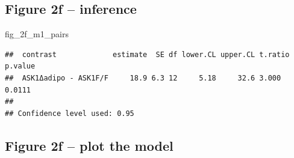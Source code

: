 \documentclass[]{book}
\newenvironment{Shaded}{\begin{snugshade}}{\end{snugshade}}
\newcommand{\DataTypeTok}[1]{\textcolor[rgb]{0.13,0.29,0.53}{#1}}
\newcommand{\KeywordTok}[1]{\textcolor[rgb]{0.13,0.29,0.53}{\textbf{#1}}}
\newcommand{\NormalTok}[1]{#1}
\newcommand{\OperatorTok}[1]{\textcolor[rgb]{0.81,0.36,0.00}{\textbf{#1}}}
\newcommand{\OtherTok}[1]{\textcolor[rgb]{0.56,0.35,0.01}{#1}}
\newcommand{\StringTok}[1]{\textcolor[rgb]{0.31,0.60,0.02}{#1}}
\begin{document}
\hypertarget{figure-2f-inference}{%
\subsection{Figure 2f -- inference}\label{figure-2f-inference}}

\begin{Shaded}
\end{Shaded}

\begin{Shaded}
\begin{Highlighting}[]
\NormalTok{fig_2f_m1_pairs}
\end{Highlighting}
\end{Shaded}

\begin{verbatim}
##  contrast             estimate  SE df lower.CL upper.CL t.ratio p.value
##  ASK1Δadipo - ASK1F/F     18.9 6.3 12     5.18     32.6 3.000   0.0111 
## 
## Confidence level used: 0.95
\end{verbatim}

\hypertarget{figure-2f-plot-the-model}{%
\subsection{Figure 2f -- plot the model}\label{figure-2f-plot-the-model}}
\end{document}
